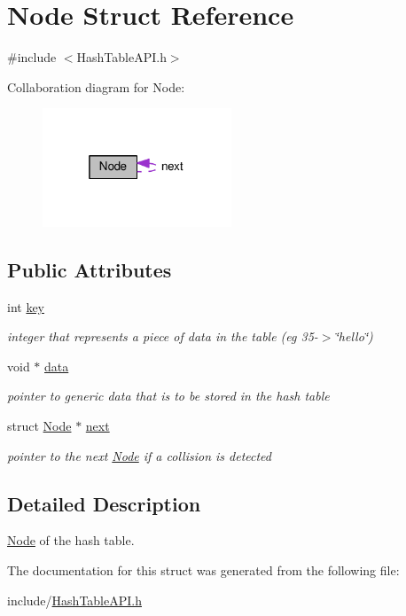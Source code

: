 \hypertarget{structNode}{}\section{Node Struct Reference}
\label{structNode}


{\ttfamily \#include $<$Hash\+Table\+A\+P\+I.\+h$>$}



Collaboration diagram for Node\+:
\nopagebreak
\begin{figure}[H]
\begin{center}
\leavevmode
\includegraphics[width=160pt]{structNode__coll__graph}
\end{center}
\end{figure}
\subsection*{Public Attributes}
\begin{DoxyCompactItemize}
\item 
\mbox{\label{structNode_a3020957813f200a9da836428aad2d8d7}} 
int \hyperlink{structNode_a3020957813f200a9da836428aad2d8d7}{key}
\begin{DoxyCompactList}\small\item\em integer that represents a piece of data in the table (eg 35-\/$>$\char`\"{}hello\char`\"{}) \end{DoxyCompactList}\item 
\mbox{\label{structNode_a38b733496e3eff5e0b4fcb11cd9b866a}} 
void $\ast$ \hyperlink{structNode_a38b733496e3eff5e0b4fcb11cd9b866a}{data}
\begin{DoxyCompactList}\small\item\em pointer to generic data that is to be stored in the hash table \end{DoxyCompactList}\item 
\mbox{\label{structNode_af67b110ca1a258b793bf69d306929b22}} 
struct \hyperlink{structNode}{Node} $\ast$ \hyperlink{structNode_af67b110ca1a258b793bf69d306929b22}{next}
\begin{DoxyCompactList}\small\item\em pointer to the next \hyperlink{structNode}{Node} if a collision is detected \end{DoxyCompactList}\end{DoxyCompactItemize}


\subsection{Detailed Description}
\hyperlink{structNode}{Node} of the hash table. 

The documentation for this struct was generated from the following file\+:\begin{DoxyCompactItemize}
\item 
include/\hyperlink{HashTableAPI_8h}{Hash\+Table\+A\+P\+I.\+h}\end{DoxyCompactItemize}
